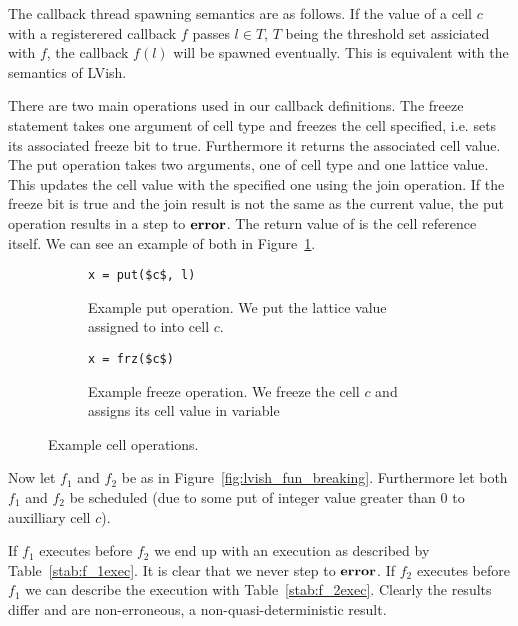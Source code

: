 The callback thread spawning semantics are as follows. If the value of a cell $c$
with a registerered callback $f$ passes $l \in T$, $T$ being the threshold set
assiciated with $f$, the callback $f(l)$ will be spawned eventually. This is
equivalent with the semantics of LVish.

There are two main operations used in our callback definitions. The freeze
statement  takes one argument of cell type and freezes the cell
specified, i.e. sets its associated freeze bit to true. Furthermore it returns
the associated cell value. The put operation  takes two arguments,
one of cell type and one lattice value. This updates the cell value with the
specified one using the join operation. If the freeze bit is true and the join
result is not the same as the current value, the put operation results in a step
to $\mbox{{\bf error}}$. The return value of  is the cell reference itself. We can
see an example of both in Figure~\ref{fig:ex_cell_op}.

\begin{figure}
  \centering
  \begin{subfigure}[t]{0.4\textwidth}
    \begin{lstlisting}[numbers=none,mathescape=true]
x = put($c$, l)
    \end{lstlisting}
    \caption{Example put operation. We put the lattice value assigned to  into
    cell $c$.}
  \end{subfigure}
  \quad
  \begin{subfigure}[t]{0.4\textwidth}
    \begin{lstlisting}[numbers=none,mathescape=true]
x = frz($c$)
    \end{lstlisting}
    \caption{Example freeze operation. We freeze the cell $c$ and assigns its cell
    value in variable }
  \end{subfigure}
  \caption{Example cell operations.}
  \label{fig:ex_cell_op}
\end{figure}

Now let $f_1$ and $f_2$ be as in Figure~\ref{fig:lvish_fun_breaking}.
Furthermore let both $f_1$ and $f_2$ be scheduled (due to some put of integer
value greater than $0$ to auxilliary cell $c$).

If $f_1$ executes before $f_2$ we end up with an execution as described by
Table~\ref{stab:f_1exec}. It is clear that we never step to $\mbox{{\bf error}}$.
If $f_2$ executes before $f_1$ we can describe the execution with
Table~\ref{stab:f_2exec}. Clearly the results differ and are non-erroneous, a
non-quasi-deterministic result.

